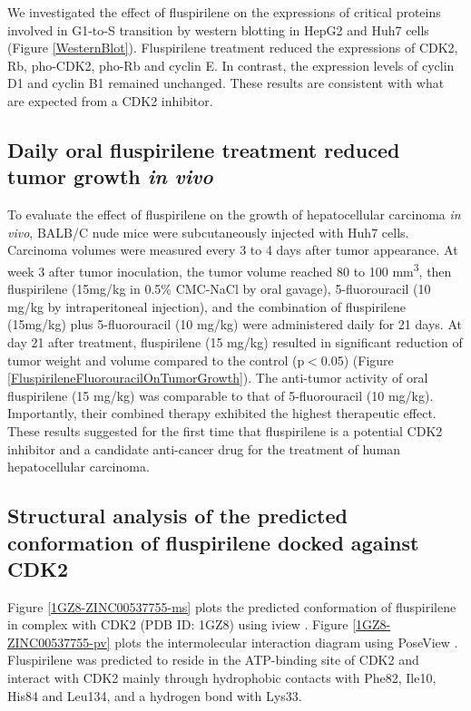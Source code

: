 \documentclass[10pt]{article}
\begin{document}
We investigated the effect of fluspirilene on the expressions of critical proteins involved in G1-to-S transition by western blotting in HepG2 and Huh7 cells (Figure \ref{WesternBlot}). Fluspirilene treatment reduced the expressions of CDK2, Rb, pho-CDK2, pho-Rb and cyclin E. In contrast, the expression levels of cyclin D1 and cyclin B1 remained unchanged. These results are consistent with what are expected from a CDK2 inhibitor.

\subsection*{Daily oral fluspirilene treatment reduced tumor growth \textit{in vivo}}

To evaluate the effect of fluspirilene on the growth of hepatocellular carcinoma \textit{in vivo}, BALB/C nude mice were subcutaneously injected with Huh7 cells. Carcinoma volumes were measured every 3 to 4 days after tumor appearance. At week 3 after tumor inoculation, the tumor volume reached 80 to 100 mm\textsuperscript{3}, then fluspirilene (15mg/kg in 0.5\% CMC-NaCl by oral gavage), 5-fluorouracil (10 mg/kg by intraperitoneal injection), and the combination of fluspirilene (15mg/kg) plus 5-fluorouracil (10 mg/kg) were administered daily for 21 days. At day 21 after treatment, fluspirilene (15 mg/kg) resulted in significant reduction of tumor weight and volume compared to the control (p$<$0.05) (Figure \ref{FluspirileneFluorouracilOnTumorGrowth}). The anti-tumor activity of oral fluspirilene (15 mg/kg) was comparable to that of 5-fluorouracil (10 mg/kg). Importantly, their combined therapy exhibited the highest therapeutic effect. These results suggested for the first time that fluspirilene is a potential CDK2 inhibitor and a candidate anti-cancer drug for the treatment of human hepatocellular carcinoma.

\subsection*{Structural analysis of the predicted conformation of fluspirilene docked against CDK2}

Figure \ref{1GZ8-ZINC00537755-ms} plots the predicted conformation of fluspirilene in complex with CDK2 (PDB ID: 1GZ8) using iview \cite{1366}. Figure \ref{1GZ8-ZINC00537755-pv} plots the intermolecular interaction diagram using PoseView \cite{748}. Fluspirilene was predicted to reside in the ATP-binding site of CDK2 and interact with CDK2 mainly through hydrophobic contacts with Phe82, Ile10, His84 and Leu134, and a hydrogen bond with Lys33.
\end{document}
